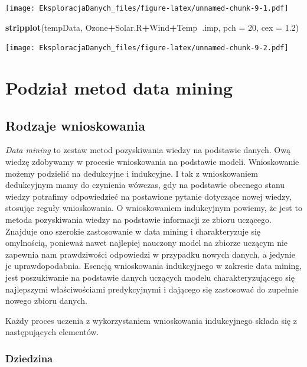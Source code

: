 \documentclass[]{book}
\newenvironment{Shaded}{\begin{snugshade}}{\end{snugshade}}
\newcommand{\DataTypeTok}[1]{\textcolor[rgb]{0.13,0.29,0.53}{#1}}
\newcommand{\DecValTok}[1]{\textcolor[rgb]{0.00,0.00,0.81}{#1}}
\newcommand{\FloatTok}[1]{\textcolor[rgb]{0.00,0.00,0.81}{#1}}
\newcommand{\KeywordTok}[1]{\textcolor[rgb]{0.13,0.29,0.53}{\textbf{#1}}}
\newcommand{\NormalTok}[1]{#1}
\newcommand{\OperatorTok}[1]{\textcolor[rgb]{0.81,0.36,0.00}{\textbf{#1}}}
\theoremstyle{plain}
\theoremstyle{definition}
\theoremstyle{definition}
\theoremstyle{definition}
\theoremstyle{definition}
\theoremstyle{remark}
\begin{document}
\texttt{[image: EksploracjaDanych\_files/figure-latex/unnamed-chunk-9-1.pdf]}

\begin{Shaded}
\begin{Highlighting}[]
\KeywordTok{stripplot}\NormalTok{(tempData, Ozone}\OperatorTok{+}\NormalTok{Solar.R}\OperatorTok{+}\NormalTok{Wind}\OperatorTok{+}\NormalTok{Temp}\OperatorTok{~}\NormalTok{.imp, }\DataTypeTok{pch =} \DecValTok{20}\NormalTok{, }\DataTypeTok{cex =} \FloatTok{1.2}\NormalTok{)}
\end{Highlighting}
\end{Shaded}

\texttt{[image: EksploracjaDanych\_files/figure-latex/unnamed-chunk-9-2.pdf]}

\hypertarget{podzia-metod-data-mining}{%
\chapter{Podział metod data mining}\label{podzia-metod-data-mining}}

\hypertarget{rodzaje-wnioskowania}{%
\section{Rodzaje wnioskowania}\label{rodzaje-wnioskowania}}

\emph{Data mining} to zestaw metod pozyskiwania wiedzy na podstawie danych. Ową wiedzę zdobywamy w procesie wnioskowania na podstawie modeli. Wnioskowanie możemy podzielić na dedukcyjne i indukcyjne. I tak z wnioskowaniem dedukcyjnym mamy do czynienia wówczas, gdy na podstawie obecnego stanu wiedzy potrafimy odpowiedzieć na postawione pytanie dotyczące nowej wiedzy, stosując reguły wnioskowania. O wnioskowaniem indukcyjnym powiemy, że jest to metoda pozyskiwania wiedzy na podstawie informacji ze zbioru uczącego. Znajduje ono szerokie zastosowanie w data mining i charakteryzuje się omylnością, ponieważ nawet najlepiej nauczony model na zbiorze uczącym nie zapewnia nam prawdziwości odpowiedzi w przypadku nowych danych, a jedynie je uprawdopodabnia. Esencją wnioskowania indukcyjnego w zakresie data mining, jest poszukiwanie na podstawie danych uczących modelu charakteryzującego się najlepszymi właściwościami predykcyjnymi i dającego się zastosować do zupełnie nowego zbioru danych.

Każdy proces uczenia z wykorzystaniem wnioskowania indukcyjnego składa się z następujących elementów.

\hypertarget{dziedzina}{%
\subsection{Dziedzina}\label{dziedzina}}
\end{document}
